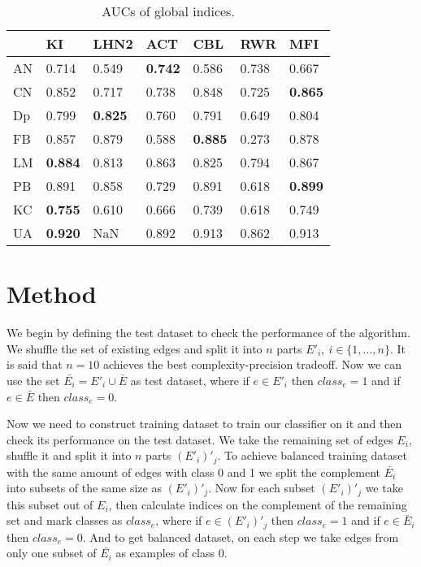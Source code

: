 \documentclass{llncs}
\begin{document}
%
\setlength{\tabcolsep}{5pt}
\renewcommand{\arraystretch}{1.5}
\begin{table}
\begin{center}
\caption{AUCs of global indices.}
\begin{tabular}{| l | l | l | l | l | l | l |}
\hline
& KI & LHN2 & ACT & CBL & RWR & MFI \\ \hline
AN & 0.714 & 0.549 & \textbf{0.742} & 0.586 & 0.738 & 0.667 \\ \hline
CN & 0.852 & 0.717 & 0.738 & 0.848 & 0.725 & \textbf{0.865} \\ \hline
Dp & 0.799 & \textbf{0.825} & 0.760 & 0.791 & 0.649 & 0.804 \\ \hline
FB & 0.857 & 0.879 & 0.588 & \textbf{0.885} & 0.273 & 0.878 \\ \hline
LM & \textbf{0.884} & 0.813 & 0.863 & 0.825 & 0.794 & 0.867 \\ \hline
PB & 0.891 & 0.858 & 0.729 & 0.891 & 0.618 & \textbf{0.899} \\ \hline
KC & \textbf{0.755} & 0.610 & 0.666 & 0.739 & 0.618 & 0.749 \\ \hline
UA & \textbf{0.920} & NaN & 0.892 & 0.913 & 0.862 & 0.913 \\ 
\hline
\end{tabular}
\end{center}
\end{table}
%
\section{Method}
%
We begin by defining the test dataset to check the performance of the algorithm. We shuffle the set of existing edges and split it into $n$ parts $E'_i, \ i \in \{1, \ldots, n\}$. It is said that $n = 10$ achieves the best complexity-precision tradeoff. Now we can use the set $\bar{E_i} = E'_i \cup \bar{E}$ as test dataset, where if $e \in E'_i$ then $class_e = 1$ and if $e \in \bar{E}$ then $class_e = 0$.

Now we need to construct training dataset to train our classifier on it and then check its performance on the test dataset. We take the remaining set of edges $E_i$, shuffle it and split it into $n$ parts $(E'_i)'_j$. To achieve balanced training dataset with the same amount of edges with class 0 and 1 we split the complement $\bar{E_i}$ into subsets of the same size as $(E'_i)'_j$. Now for each subset $(E'_i)'_j$ we take this subset out of $E_i$, then calculate indices on the complement of the remaining set and mark classes as $class_e$, where if $e \in (E'_i)'_j$ then $class_e = 1$ and if $e \in \bar{E}_i$ then $class_e = 0$. And to get balanced dataset, on each step we take edges from only one subset of $\bar{E_i}$ as examples of class 0.
\end{document}
